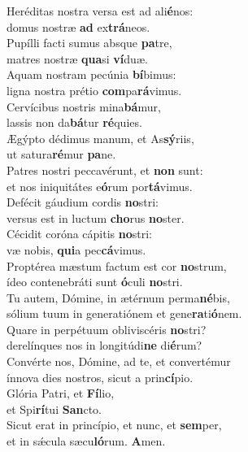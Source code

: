 \evenverse Heréditas nostra versa est ad ali\textbf{é}nos:~\*\\
\evenverse domus nostræ \textbf{ad} ex\textbf{trá}neos.\\
\oddverse Pupílli facti sumus absque \textbf{pa}tre,~\*\\
\oddverse matres nostræ \textbf{qua}si \textbf{ví}duæ.\\
\evenverse Aquam nostram pecúnia \textbf{bí}bimus:~\*\\
\evenverse ligna nostra prétio \textbf{com}pa\textbf{rá}vimus.\\
\oddverse Cervícibus nostris mina\textbf{bá}mur,~\*\\
\oddverse lassis non da\textbf{bá}tur \textbf{ré}quies.\\
\evenverse Ægýpto dédimus manum, et As\textbf{sý}riis,~\*\\
\evenverse ut satura\textbf{ré}mur \textbf{pa}ne.\\
\oddverse Patres nostri peccavérunt, et \textbf{non} sunt:~\*\\
\oddverse et nos iniquitátes e\textbf{ó}rum por\textbf{tá}vimus.\\
\evenverse Defécit gáudium cordis \textbf{no}stri:~\*\\
\evenverse versus est in luctum \textbf{cho}rus \textbf{no}ster.\\
\oddverse Cécidit coróna cápitis \textbf{no}stri:~\*\\
\oddverse væ nobis, \textbf{qui}a pec\textbf{cá}vimus.\\
\evenverse Proptérea mæstum factum est cor \textbf{no}strum,~\*\\
\evenverse ídeo contenebráti sunt \textbf{ó}culi \textbf{no}stri.\\
\oddverse Tu autem, Dómine, in ætérnum perma\textbf{né}bis,~\*\\
\oddverse sólium tuum in generatiónem et gene\textbf{ra}ti\textbf{ó}nem.\\
\evenverse Quare in perpétuum obliviscéris \textbf{no}stri?~\*\\
\evenverse derelínques nos in longitúdi\textbf{ne} di\textbf{é}rum?\\
\oddverse Convérte nos, Dómine, ad te, et convertémur~\*\\
\oddverse ínnova dies nostros, sicut a prin\textbf{cí}pio.\\
\evenverse Glória Patri, et \textbf{Fí}lio,~\*\\
\evenverse et Spi\textbf{rí}tui \textbf{San}cto.\\
\oddverse Sicut erat in princípio, et nunc, et \textbf{sem}per,~\*\\
\oddverse et in sǽcula sæcu\textbf{ló}rum. \textbf{A}men.\\
